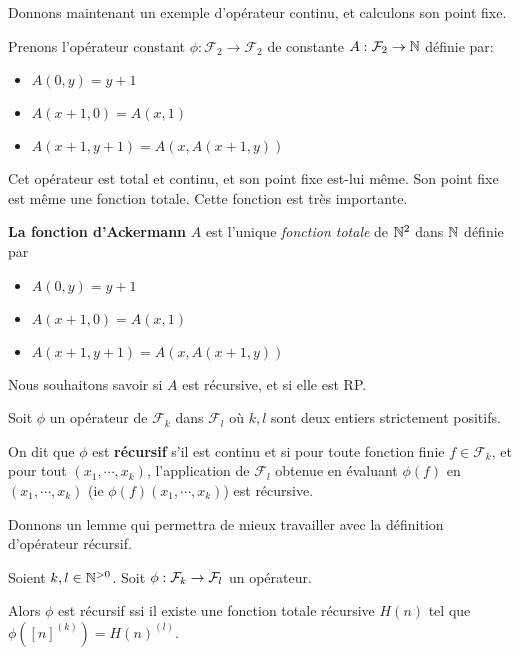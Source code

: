Donnons maintenant un exemple d'opérateur continu, et calculons son point fixe.

Prenons l'opérateur constant $\phi : \mathcal{F}_{2} \rightarrow
\mathcal{F}_{2}$ de constante $A : \mathcal{F}_{2} \rightarrow \mathbb{N}$ définie
par:

\begin{itemize}
	\item $A(0, y) = y + 1$
	\item $A(x + 1, 0) = A(x, 1)$
	\item $A(x + 1, y + 1) = A(x, A(x + 1, y))$
\end{itemize}

Cet opérateur est total et continu, et son point fixe est-lui même. Son point
fixe est même une fonction totale. Cette fonction est très importante.

\begin{definition}
	\textbf{La fonction d'Ackermann} $A$ est l'unique \textit{fonction totale}
	de $\mathbb{N}^{2}$ dans $\mathbb{N}$ définie par
	\begin{itemize}
		\item $A(0, y) = y + 1$
		\item $A(x + 1, 0) = A(x, 1)$
		\item $A(x + 1, y + 1) = A(x, A(x + 1, y))$
	\end{itemize}
\end{definition}

Nous souhaitons savoir si $A$ est récursive, et si elle est RP.

\begin{definition}
	Soit $\phi$ un opérateur de $\mathcal{F}_{k}$ dans $\mathcal{F}_{l}$ où $k,
	l$ sont deux entiers strictement positifs.

	On dit que $\phi$ est \textbf{récursif} s'il est continu et si pour toute fonction finie $f \in
	\mathcal{F}_{k}$, et pour tout $(x_{1}, \cdots, x_{k})$, l'application de
	$\mathcal{F}_{l}$ obtenue en évaluant $\phi(f)$ en $(x_{1}, \cdots, x_{k})$ (ie
	$\phi(f)(x_{1}, \cdots, x_{k})$) est récursive.
\end{definition}

Donnons un lemme qui permettra de mieux travailler avec la définition
d'opérateur récursif.

\begin{lemma}
	Soient $k, l \in \mathbb{N}^{> 0}$.
	Soit $\phi : \mathcal{F}_{k} \rightarrow \mathcal{F}_{l}$ un opérateur.

	Alors $\phi$ est récursif ssi il existe une fonction totale récursive $H(n)$
	tel que $\phi([n]^{(k)}) = H(n)^{(l)}$.
\end{lemma}


